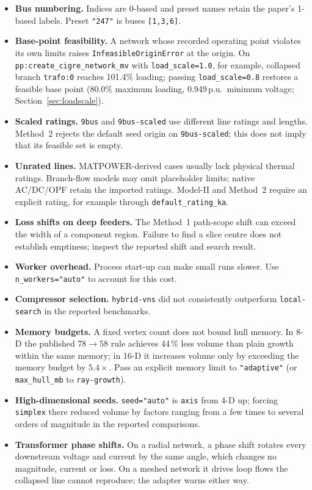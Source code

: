 \documentclass[11pt,a4paper]{report}
\newcommand{\code}[1]{\texttt{\small #1}}
\begin{document}
\begin{itemize}
\item \textbf{Bus numbering.} Indices are 0-based and preset names retain the
  paper's 1-based labels. Preset
  \code{"247"} is buses \code{[1,3,6]}.
\item \textbf{Base-point feasibility.}
  A network whose recorded operating point violates its own limits raises
  \code{InfeasibleOriginError} at the origin. On
  \code{pp:create\_cigre\_network\_mv} with \code{load\_scale=1.0}, for
  example, collapsed branch \code{trafo:0} reaches 101.4\% loading; passing
  \code{load\_scale=0.8} restores a feasible base point (80.0\% maximum
  loading, 0.949\,p.u.\ minimum voltage; Section~\ref{sec:loadscale}).
\item \textbf{Scaled ratings.} \code{9bus} and \code{9bus-scaled} use different
  line ratings and lengths.
  Method~2 rejects the default seed origin on \code{9bus-scaled}; this does not
  imply that its feasible set is empty.
\item \textbf{Unrated lines.} MATPOWER-derived cases usually lack physical
  thermal ratings. Branch-flow models may omit placeholder limits; native
  AC/DC/OPF retain the imported ratings. Model-II and Method~2 require an
  explicit rating, for example through \code{default\_rating\_ka}.
\item \textbf{Loss shifts on deep feeders.} The Method~1 path-scope shift can
  exceed the width of a component region. Failure to find a slice centre does
  not establish emptiness; inspect the reported shift and search result.
\item \textbf{Worker overhead.} Process start-up can make small runs slower.
  Use \code{n\_workers="auto"} to account for this cost.
\item \textbf{Compressor selection.} \code{hybrid-vns} did not consistently
  outperform \code{local-search} in the reported benchmarks.
\item \textbf{Memory budgets.} A fixed vertex count does not bound hull memory.
  In 8-D the published
  $78\to58$ rule achieves 44\,\% less volume than plain growth within the same
  memory; in 16-D it increases volume only by exceeding the memory budget by
  $5.4\times$. Pass an explicit memory limit to \code{"adaptive"} (or
  \code{max\_hull\_mb} to \code{ray-growth}).
\item \textbf{High-dimensional seeds.}
  \code{seed="auto"} is \code{axis} from 4-D up; forcing \code{simplex} there
  reduced volume by factors ranging from a few times to several orders of
  magnitude in the reported comparisons.
\item \textbf{Transformer phase shifts.} On a radial network, a phase shift
  rotates every downstream voltage and current by the same angle,
  which changes no magnitude, current or loss. On a meshed network it drives loop
  flows the collapsed line cannot reproduce; the adapter warns either way.
\end{itemize}
\end{document}
